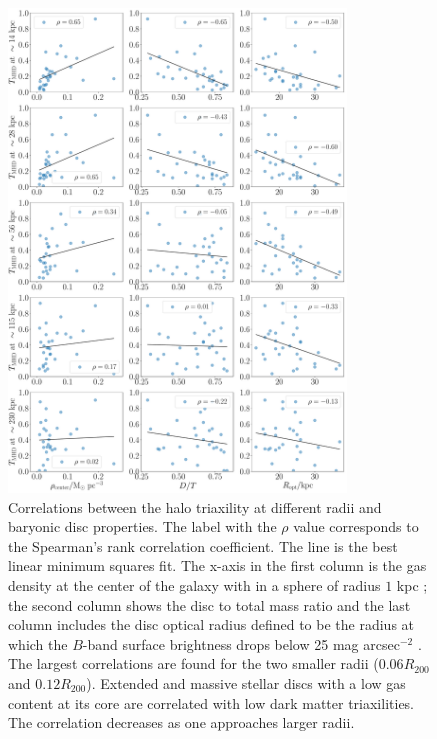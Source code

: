 \documentclass[usenatbib]{mnras}
\begin{document}
\begin{figure}
\begin{center}
\includegraphics[width=0.8\textwidth]{correlation_T_MHD_disc.pdf}
\end{center}
\caption{Correlations between the halo triaxility at different radii
  and baryonic disc properties. 
  The label with the $\rho$ value corresponds to the Spearman's rank
  correlation coefficient.
  The line is the best linear minimum squares fit.
  The x-axis in the first column is the gas density at the center of
  the galaxy with in a sphere of radius  $1$ kpc \citep{Pakmor17};
  the second column shows the disc to total mass ratio and the last
  column includes the disc optical radius defined to be the radius at which the
  $B$-band surface brightness drops below 25 mag arcsec$^{-2}$ \citep{auriga}.
  The largest correlations are found for the two smaller radii
  ($0.06R_{200}$ and $0.12R_{200}$).
  Extended and massive stellar discs with a low gas content at its
  core are correlated with low dark matter triaxilities.
  The correlation decreases as one approaches larger radii.}
\label{fig:disc_correlations}
\end{figure}
\end{document}
